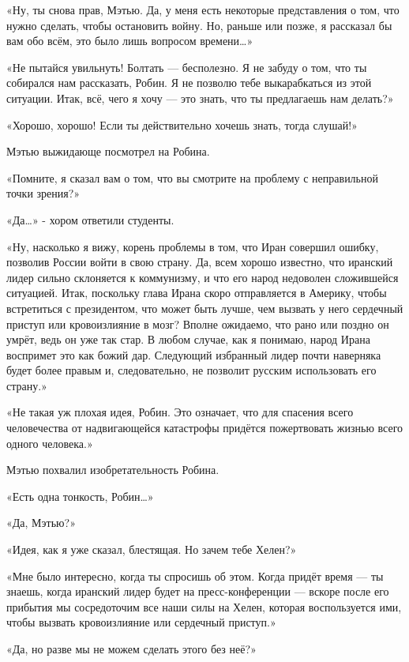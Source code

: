 \documentclass[a4paper,12pt]{book}
\begin{document}
\par
«Ну, ты снова прав, Мэтью. Да, у меня есть некоторые представления о том, что нужно сделать, чтобы остановить войну. Но, раньше или позже, я рассказал бы вам обо всём, это было лишь вопросом времени…»
\par
«Не пытайся увильнуть! Болтать — бесполезно. Я не забуду о том, что ты собирался нам рассказать, Робин. Я не позволю тебе выкарабкаться из этой ситуации. Итак, всё, чего я хочу — это знать, что ты предлагаешь нам делать?»
\par
«Хорошо, хорошо! Если ты действительно хочешь знать, тогда слушай!»
\par
Мэтью выжидающе посмотрел на Робина.
\par
«Помните, я сказал вам о том, что вы смотрите на проблему с неправильной точки зрения?»
\par
«Да…» - хором ответили студенты.
\par
«Ну, насколько я вижу, корень проблемы в том, что Иран совершил ошибку, позволив России войти в свою страну. Да, всем хорошо известно, что иранский лидер сильно склоняется к коммунизму, и что его народ недоволен сложившейся ситуацией. Итак, поскольку глава Ирана скоро отправляется в Америку, чтобы встретиться с президентом, что может быть лучше, чем вызвать у него сердечный приступ или кровоизлияние в мозг? Вполне ожидаемо, что рано или поздно он умрёт, ведь он уже так стар. В любом случае, как я понимаю, народ Ирана воспримет это как божий дар. Следующий избранный лидер почти наверняка будет более правым и, следовательно, не позволит русским использовать его страну.»
\par
«Не такая уж плохая идея, Робин. Это означает, что для спасения всего человечества от надвигающейся катастрофы придётся пожертвовать жизнью всего одного человека.»
\par
Мэтью похвалил изобретательность Робина.
\par
«Есть одна тонкость, Робин…»
\par
«Да, Мэтью?»
\par
«Идея, как я уже сказал, блестящая. Но зачем тебе Хелен?»
\par
«Мне было интересно, когда ты спросишь об этом. Когда придёт время — ты знаешь, когда иранский лидер будет на пресс-конференции — вскоре после его прибытия мы сосредоточим все наши силы на Хелен, которая воспользуется ими, чтобы вызвать кровоизлияние или сердечный приступ.»
\par
«Да, но разве мы не можем сделать этого без неё?»
\par
\end{document}
